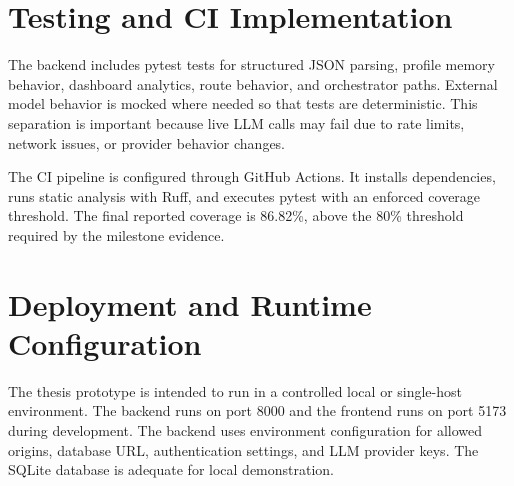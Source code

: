 
\section{Testing and CI Implementation}

The backend includes pytest tests for structured JSON parsing, profile memory behavior, dashboard analytics, route behavior, and orchestrator paths. External model behavior is mocked where needed so that tests are deterministic. This separation is important because live LLM calls may fail due to rate limits, network issues, or provider behavior changes.

The CI pipeline is configured through GitHub Actions. It installs dependencies, runs static analysis with Ruff, and executes pytest with an enforced coverage threshold. The final reported coverage is 86.82\%, above the 80\% threshold required by the milestone evidence.



\section{Deployment and Runtime Configuration}

The thesis prototype is intended to run in a controlled local or single-host environment. The backend runs on port 8000 and the frontend runs on port 5173 during development. The backend uses environment configuration for allowed origins, database URL, authentication settings, and LLM provider keys. The SQLite database is adequate for local demonstration.


